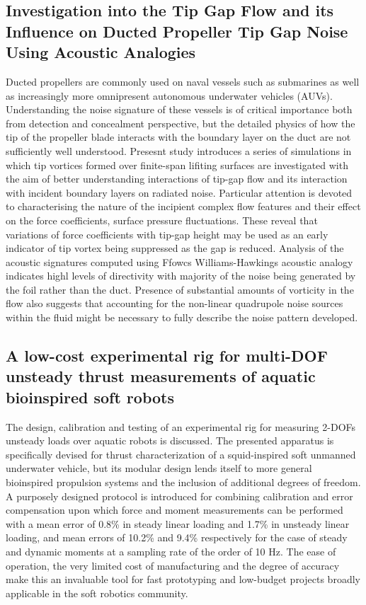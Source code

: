 \documentclass[a4paper,10pt]{article}
\begin{document}
\subsection{Investigation into the Tip Gap Flow and its Influence on Ducted Propeller Tip Gap Noise Using Acoustic Analogies \cite{Higgens2018}}

	Ducted propellers are commonly used on naval vessels such as submarines as well as increasingly more omnipresent autonomous underwater vehicles (AUVs). Understanding the noise signature of these vessels is of critical importance both from detection and concealment perspective, but the detailed physics of how the tip of the propeller blade interacts with the boundary layer on the duct are not sufficiently well understood. Presesnt study introduces a series of simulations in which tip vortices formed over finite-span lifiting surfaces are investigated with the aim of better understanding interactions of tip-gap flow and its interaction with incident boundary layers on radiated noise. Particular attention is devoted to characterising the nature of the incipient complex flow features and their effect on the force coefficients, surface pressure fluctuations. These reveal that variations of force coefficients with tip-gap height may be used as an early indicator of tip vortex being suppressed as the gap is reduced. Analysis of the acoustic signatures computed using Ffowcs Williams-Hawkings acoustic analogy indicates highl levels of directivity with majority of the noise being generated by the foil rather than the duct. Presence of substantial amounts of vorticity in the flow also suggests that accounting for the non-linear quadrupole noise sources within the fluid might be necessary to fully describe the noise pattern developed.

\subsection{A low-cost experimental rig for multi-DOF unsteady thrust measurements of aquatic bioinspired soft robots \cite{Lidtke2018a}}

	The design, calibration and testing of an experimental rig for measuring 2-DOFs unsteady loads over aquatic robots is discussed. The presented apparatus is specifically devised for thrust characterization of a squid-inspired soft unmanned underwater vehicle, but its modular design lends itself to more general bioinspired propulsion systems and the inclusion of additional degrees of freedom. A purposely designed protocol is introduced for combining calibration and error compensation upon which force and moment measurements can be performed with a mean error of 0.8\% in steady linear loading and 1.7\% in unsteady linear loading, and mean errors of 10.2\% and 9.4\% respectively for the case of steady and dynamic moments at a sampling rate of the order of 10 Hz. The ease of operation, the very limited cost of manufacturing and the degree of accuracy make this an invaluable tool for fast prototyping and low-budget projects broadly applicable in the soft robotics community.
\end{document}
